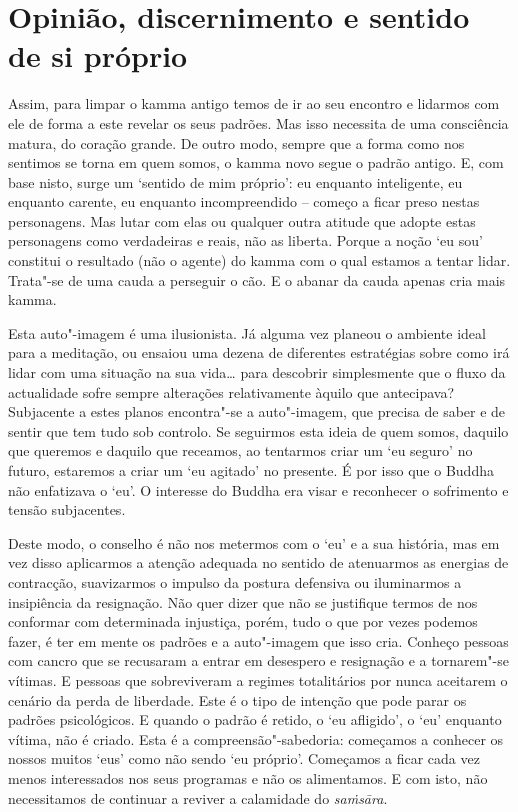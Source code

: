 \section{Opinião, discernimento e sentido de si próprio}

Assim, para limpar o kamma antigo temos de ir ao seu encontro e lidarmos com ele
de forma a este revelar os seus padrões. Mas isso necessita de uma consciência
matura, do coração grande. De outro modo, sempre que a forma como nos sentimos
se torna em quem somos, o kamma novo segue o padrão antigo. E, com base nisto,
surge um `sentido de mim próprio': eu enquanto inteligente, eu enquanto carente,
eu enquanto incompreendido -- começo a ficar preso nestas personagens. Mas lutar
com elas ou qualquer outra atitude que adopte estas personagens como verdadeiras
e reais, não as liberta. Porque a noção `eu sou' constitui o resultado (não o
agente) do kamma com o qual estamos a tentar lidar. Trata"-se de uma cauda a
perseguir o cão. E o abanar da cauda apenas cria mais kamma.

Esta auto"-imagem é uma ilusionista. Já alguma vez planeou o ambiente ideal para
a meditação, ou ensaiou uma dezena de diferentes estratégias sobre como irá
lidar com uma situação na sua vida\ldots{} para descobrir simplesmente que o fluxo da
actualidade sofre sempre alterações relativamente àquilo que antecipava?
Subjacente a estes planos encontra"-se a auto"-imagem, que precisa de saber e de
sentir que tem tudo sob controlo. Se seguirmos esta ideia de quem somos, daquilo
que queremos e daquilo que receamos, ao tentarmos criar um `eu seguro' no
futuro, estaremos a criar um `eu agitado' no presente. É por isso que o Buddha
não enfatizava o `eu'. O interesse do Buddha era visar e reconhecer o sofrimento
e tensão subjacentes.

Deste modo, o conselho é não nos metermos com o `eu' e a sua história, mas em
vez disso aplicarmos a atenção adequada no sentido de atenuarmos as energias de
contracção, suavizarmos o impulso da postura defensiva ou iluminarmos a
insipiência da resignação. Não quer dizer que não se justifique termos de nos
conformar com determinada injustiça, porém, tudo o que por vezes podemos fazer,
é ter em mente os padrões e a auto"-imagem que isso cria. Conheço pessoas com
cancro que se recusaram a entrar em desespero e resignação e a tornarem"-se
vítimas. E pessoas que sobreviveram a regimes totalitários por nunca aceitarem o
cenário da perda de liberdade. Este é o tipo de intenção que pode parar os
padrões psicológicos. E quando o padrão é retido, o `eu afligido', o `eu'
enquanto vítima, não é criado. Esta é a compreensão"-sabedoria: começamos a
conhecer os nossos muitos `eus' como não sendo `eu próprio'. Começamos a ficar
cada vez menos interessados nos seus programas e não os alimentamos. E com isto,
não necessitamos de continuar a reviver a calamidade do \emph{saṁsāra}.

